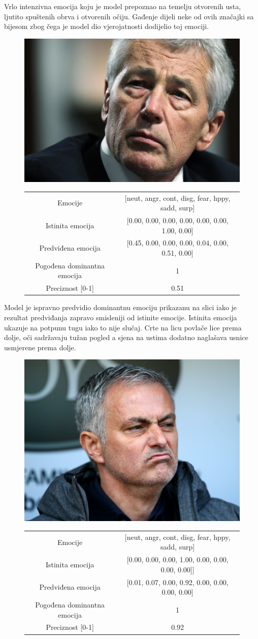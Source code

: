 \documentclass[times, utf8, zavrsni,numeric,pstricks]{fer}
\begin{document}
Vrlo intenzivna emocija koju je model prepoznao na temelju otvorenih usta, ljutito spuštenih obrva i otvorenih očiju. Gađenje dijeli neke od ovih značajki sa bijesom zbog čega je model dio vjerojatnosti dodijelio toj emociji.

\begin{figure}[H]
\centering
		\includegraphics[width=0.3\linewidth, keepaspectratio]{123apictures-sad-faces-162434-9053652}
		\begin{tabular}
					{|c|c|}\hline
					Emocije & [neut, angr, cont, disg, fear, hppy, sadd, surp]\\
					Istinita emocija & [0.00, 0.00, 0.00, 0.00, 0.00, 0.00, 1.00, 0.00]\\
					Predviđena emocija	& [0.45, 0.00, 0.00, 0.00, 0.04, 0.00, 0.51, 0.00]\\
					Pogođena dominantna emocija & 1\\
					Preciznost [0-1] & 0.51\\
					\hline
		\end{tabular}
\end{figure}

Model je ispravno predvidio dominantnu emociju prikazanu na slici iako je rezultat predviđanja zapravo smisleniji od istinite emocije. Istinita emocija ukazuje na potpunu tugu iako to nije slučaj. Crte na licu povlače lice prema dolje, oči sadržavaju tužan pogled a sjena na ustima dodatno naglašava usnice usmjerene prema dolje.

\begin{figure}[H]
\centering
		\includegraphics[width=0.3\linewidth, keepaspectratio]{255ajose-mourinho.png}
		\begin{tabular}
					{|c|c|}\hline
					Emocije & [neut, angr, cont, disg, fear, hppy, sadd, surp]\\
					Istinita emocija & [0.00, 0.00, 0.00, 1.00, 0.00, 0.00, 0.00, 0.00]]\\
					Predviđena emocija	& [0.01, 0.07, 0.00, 0.92, 0.00, 0.00, 0.00, 0.00]\\
					Pogođena dominantna emocija & 1\\
					Preciznost [0-1] & 0.92\\
					\hline
		\end{tabular}
\end{figure}
\end{document}
